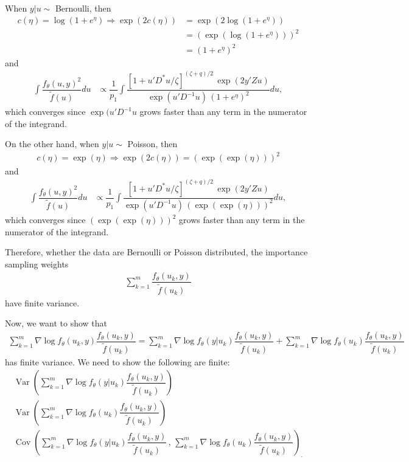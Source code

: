 \documentclass{article}
\DeclareMathOperator{\var}{Var}
\DeclareMathOperator{\cov}{Cov}
\begin{document}
When $y|u\sim$ Bernoulli, then
\begin{align}
c(\eta)=\log(1+e^\eta) \Rightarrow \exp(2c(\eta))&= \exp( 2 \log(1+e^\eta)  )\\
&= ( \exp( \log(1+e^\eta)  )  )^2\\
&= (1+e^\eta) ^2
\end{align}
and
\begin{align}
\int \dfrac{f_\theta(u,y)^2}{\tilde{f}(u)} du &\propto \dfrac{1}{p_1} \int \dfrac{ \left[ 1+u'D^*u/\zeta  \right]^{(\zeta+q)/2} \, \exp(2y'Zu)  }{\exp(u'D^{-1}u)   \,  (1+e^\eta) ^2  } du,
\end{align}
which converges since $\exp(u'D^{-1}u$ grows faster than any term in the numerator of the integrand.

On the other hand, when $y|u\sim$ Poisson, then 
\begin{align}
c(\eta)=\exp(\eta) \Rightarrow \exp(2 c(\eta)) = (\exp(\exp(\eta)))^2
\end{align}
and
\begin{align}
\int \dfrac{f_\theta(u,y)^2}{\tilde{f}(u)} du &\propto \dfrac{1}{p_1} \int \dfrac{ \left[ 1+u'D^*u/\zeta  \right]^{(\zeta+q)/2} \, \exp(2y'Zu)  }{\exp(u'D^{-1}u)   \,   (\exp(\exp(\eta)))^2  } du,
\end{align}
which converges since  $(\exp(\exp(\eta)))^2$ grows faster than any term in the numerator of the integrand.  

Therefore, whether the data are Bernoulli or Poisson distributed, the importance sampling weights 
\begin{align}
\sum_{k=1}^m  \dfrac{f_\theta(u_k,y)}{\tilde{f}(u_k)}
\end{align}
have finite variance.

Now, we want to show that
\begin{align}
\sum_{k=1}^m \nabla \log f_\theta (u_k,y) \dfrac{f_\theta(u_k,y)}{\tilde{f}(u_k)} =\sum_{k=1}^m \nabla \log f_\theta (y|u_k) \dfrac{f_\theta(u_k,y)}{\tilde{f}(u_k)} +\sum_{k=1}^m \nabla \log f_\theta (u_k) \dfrac{f_\theta(u_k,y)}{\tilde{f}(u_k)} 
\end{align}
 has finite variance. We need to show the following are finite:
\begin{align}
\var \left( \sum_{k=1}^m \nabla \log f_\theta (y|u_k) \dfrac{f_\theta(u_k,y)}{\tilde{f}(u_k)}   \right) \\
\var \left(\sum_{k=1}^m \nabla \log f_\theta (u_k) \dfrac{f_\theta(u_k,y)}{\tilde{f}(u_k)} \right)\\
\cov \left(\sum_{k=1}^m \nabla \log f_\theta (y|u_k) \dfrac{f_\theta(u_k,y)}{\tilde{f}(u_k)} \, , \, \sum_{k=1}^m \nabla \log f_\theta (u_k) \dfrac{f_\theta(u_k,y)}{\tilde{f}(u_k)} \right)_.
\end{align}
\end{document}
